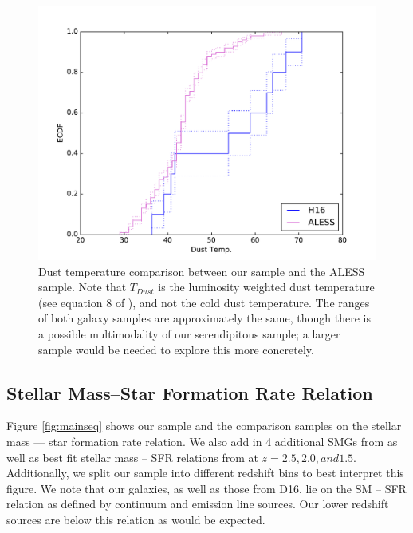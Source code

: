 \documentclass[preprint,natbib209]{aastex}
\begin{document}
\begin{figure}[t]
\centering
\includegraphics[scale=0.8]{ecdf_tdust.pdf}
\caption{Dust temperature comparison between our sample and the ALESS sample. Note that $T_{Dust}$ is the luminosity weighted dust temperature (see equation 8 of \cite{dacunha15}), and not the cold dust temperature. The ranges of both galaxy samples are approximately the same, though there is a possible multimodality of our serendipitous sample; a larger sample would be needed to explore this more concretely.}
\label{fig:tdust}
\end{figure}

\subsection{Stellar Mass--Star Formation Rate Relation}

Figure \ref{fig:mainseq} shows our sample and the comparison samples on the stellar mass --- star formation rate relation. We also add in 4 additional SMGs from \cite{yamaguchi16} as well as best fit stellar mass -- SFR relations from \cite{speagle14} at $z = 2.5, 2.0, and 1.5$. Additionally, we split our sample into different redshift bins to best interpret this figure.  We note that our galaxies, as well as those from D16, lie on the SM -- SFR relation as defined by continuum and emission line sources. Our lower redshift sources are below this relation as would be expected.
\end{document}
